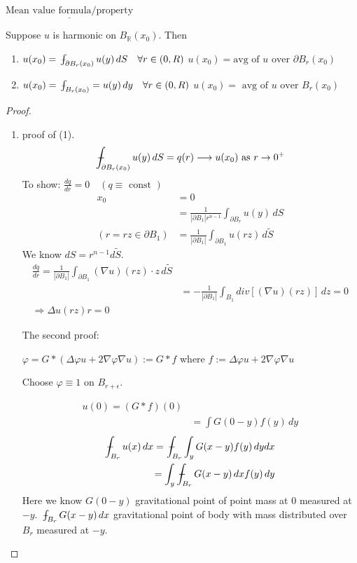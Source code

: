 \documentclass[11pt]{article}
\begin{document}
$\underline{\text{Mean value formula/property}}$
\begin{proposition}
    Suppose $u$ is harmonic on $B_{\mathbb{R}}(x_0)$. Then
    \begin{enumerate}
        \item $u(x_0) = \barint_{\partial B_{r}(x_0)} u(y)\, dS \quad \forall r \in (0,R)$
        $u(x_0) = \text{avg of }u \text{ over } \partial B_{r}(x_0)$
        \item $u(x_0) = \barint_{B_{r}(x_0)} = u(y)\, dy \quad \forall r \in (0,R)$
        $u(x_0) = \text{ avg of }u \text{ over } B_{r}(x_0)$
    \end{enumerate}
\end{proposition}
\begin{proof}
    \begin{enumerate}
        \item proof of (1).
        \begin{align*}
            \barint_{\partial B_{r}(x_0)} u(y)\, dS = q(r) \longrightarrow u(x_0) \text{ as }
                r \rightarrow 0^{+}
        \end{align*}
        To show: $\frac{dq}{dr}=0 \quad (q \equiv \text{ const })$ 
        \begin{align*}
            x_0 &= 0\\
            &= \frac{1}{|\partial B_1|r^{n-1}} \int _{\partial B_r}u(y)\, dS\\
            (r= rz \in \partial B_1) &= \frac{1}{|\partial B_1|} \int_{\partial B_1}u(rz)\, d\tilde{S}
        \end{align*}
        We know $dS = r^{n-1}d\tilde{S}$.
        \begin{align*}
            \frac{dq}{dr} = \frac{1}{|\partial B_1|} \int_{\partial B_1}(\nabla u)(rz)\cdot z \,d\tilde{S}\\
            &= -\frac{1}{|\partial B_1|}\int_{B_1}div[(\nabla u)(rz)]\, dz = 0\\
            \Longrightarrow \Delta u(rz) r = 0
        \end{align*}
        
        The second proof:

        $\varphi = G * (\Delta \varphi u + 2 \nabla \varphi \nabla u) := G*f$ where
        $f := \Delta \varphi u + 2 \nabla \varphi \nabla u$

        Choose $\varphi \equiv 1$ on $B_{r+\epsilon}$.

        \begin{align*}
            u(0) = (G*f)(0)\\
            &= \int G(0-y)f(y)\, dy
        \end{align*}
        \begin{align*}
            \barint _{B_r} u(x)\, dx = \barint_{B_r} \int_{y}G(x-y)f(y) \, dy dx\\
            = \int_{y} \barint_{B_r}G(x-y)\,dx f(y)\,dy
        \end{align*}
        Here we know $G(0-y)$ gravitational point of point mass at $0$ measured at $-y$.
        $\barint_{B_r}G(x-y)\, dx$ gravitational point of body with mass distributed over $B_r$ measured 
        at $-y$. 


\end{enumerate}
\end{proof}
\end{document}
